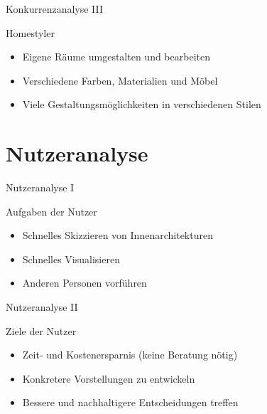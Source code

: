 \documentclass[presentation,bigger,aspectratio=169]{beamer}
\begin{document}
\begin{frame}[label={sec:org4bd34ef}]{Konkurrenzanalyse III}
\begin{block}{Homestyler}
\begin{itemize}
\item Eigene Räume umgestalten und bearbeiten
\item Verschiedene Farben, Materialien und Möbel
\item Viele Gestaltungsmöglichkeiten in verschiedenen Stilen
\end{itemize}
\end{block}
\end{frame}
\section{Nutzeranalyse}
\label{sec:org018b822}
\begin{frame}[label={sec:orga823ad2}]{\vspace{2.2cm}\begin{center}\MakeUppercase{\insertsection}\end{center}}
\end{frame}

\begin{frame}[label={sec:org44e9dbe}]{Nutzeranalyse I}
\begin{block}{Aufgaben der Nutzer}
\begin{itemize}
\item Schnelles Skizzieren von Innenarchitekturen
\item Schnelles Visualisieren
\item Anderen Personen vorführen
\end{itemize}
\end{block}
\end{frame}
\begin{frame}[label={sec:org2ee045e}]{Nutzeranalyse II}
\begin{block}{Ziele der Nutzer}
\begin{itemize}
\item Zeit- und Kostenersparnis (keine Beratung nötig)
\item Konkretere Vorstellungen zu entwickeln
\item Bessere und nachhaltigere Entscheidungen treffen
\end{itemize}
\end{block}
\end{frame}
\end{document}
